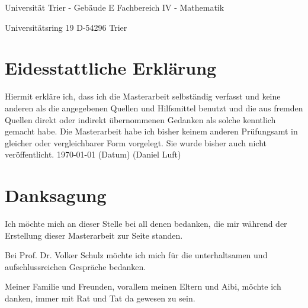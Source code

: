 \documentclass[bibliography=totoc,12pt,a4paper]{scrartcl}
\theoremstyle{exampstyle}
\numberwithin{equation}{section}
\begin{document}
\vspace{10cm}
Universität Trier - Gebäude E \newline
Fachbereich IV - Mathematik

Universitätsring 19 \newline
D-54296 Trier

\section*{Eidesstattliche Erklärung}
Hiermit erkläre ich, dass ich die Masterarbeit selbständig verfasst und keine anderen als die angegebenen Quellen und Hilfsmittel benutzt und die aus fremden Quellen direkt oder indirekt übernommenen
Gedanken als solche kenntlich gemacht habe. Die Masterarbeit habe ich bisher keinem anderen Prüfungsamt in gleicher oder vergleichbarer Form vorgelegt. Sie wurde bisher auch nicht veröffentlicht.
\vspace{1.5cm}
\today \newline
(Datum) \hspace{9cm} (Daniel Luft)



\newpage




\section*{Danksagung}

Ich möchte mich an dieser Stelle bei all denen bedanken, die mir während der Erstellung dieser Masterarbeit zur Seite standen. 
\newline

Bei Prof. Dr. Volker Schulz möchte ich mich für die unterhaltsamen und aufschlussreichen Gespräche bedanken. 
\newline 

Meiner Familie und Freunden, vorallem meinen Eltern und Aibi, möchte ich danken, immer mit Rat und Tat da gewesen zu sein.

\newpage

  \tableofcontents

\newpage

  \pagestyle{headings}
  
\end{document}
